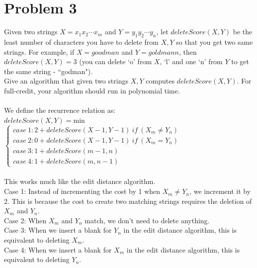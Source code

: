 \documentclass[10pt,letterpaper]{article}
\begin{document}
\pagebreak

\section{Problem 3}
Given two strings $X = x_1x_2\cdots x_m$ and $Y = y_1 y_2 \cdots y_n$, let $deleteScore(X,Y)$ be the least number of characters you have to delete from $X,Y$ so that you get two same strings. For example, if $X = goodman$ and $Y = goldmann$, then $deleteScore(X,Y) = 3$ (you can delete `o' from $X$, `l' and one `n' from $Y$ to get the same string - ``godman").\\
Give an algorithm that given two strings $X,Y$ computes $deleteScore(X,Y)$. For full-credit, your algorithm should run in polynomial time.\\\\
We define the recurrence relation as:\\
$deleteScore(X,Y)=$min$
	\begin{cases}
	case \ 1: 2+deleteScore(X-1,Y-1) \ if \ (X_m \neq Y_n) \\
	case \ 2: 0+deleteScore(X-1,Y-1) \ if \ (X_m = Y_n) \\
	case \ 3: 1+deleteScore(m-1,n) \\
	case \ 4: 1+deleteScore(m,n-1)
	\end{cases}$\\\\
This works much like the edit distance algorithm.\\
Case 1: Instead of incrementing the cost by 1 when $X_m \neq Y_n$, we increment it by 2. This is because the cost to create two matching strings requires the deletion of $X_m$ and $Y_n$.\\
Case 2: When $X_m$ and $Y_n$ match, we don't need to delete anything.\\
Case 3: When we insert a blank for $Y_n$ in the edit distance algorithm, this is equivalent to deleting $X_m$.\\
Case 4: When we insert a blank for $X_m$ in the edit distance algorithm, this is equivalent to deleting $Y_n$.\\

\pagebreak

\end{document}

